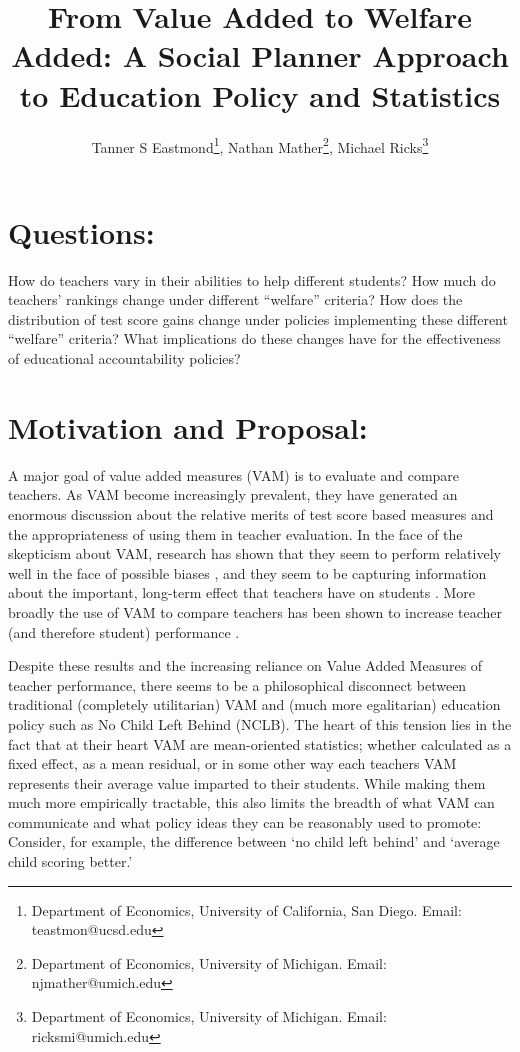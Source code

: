 \documentclass[letterpaper,12pt]{article}
\title{From Value Added to Welfare Added: A Social Planner Approach to Education Policy and Statistics}
\author{Tanner S Eastmond\thanks{Department of Economics, University of California, San Diego. Email: teastmon@ucsd.edu}, Nathan Mather\thanks{Department of Economics, University of Michigan. Email: njmather@umich.edu }, Michael Ricks\thanks{Department of Economics, University of Michigan. Email: ricksmi@umich.edu}}
\date{\vspace{-8ex}}
\begin{document}
\maketitle



\section{Questions:} 
How do teachers vary in their abilities to help different students? How much do teachers' rankings change under different ``welfare'' criteria? How does the distribution of test score gains change under policies implementing these different ``welfare'' criteria? What implications do these changes have for the effectiveness of educational accountability policies? 



\section{Motivation and Proposal:}
A major goal of value added measures (VAM) is to evaluate and compare teachers. As VAM become increasingly prevalent, they have generated an enormous discussion about the relative merits of test score based measures and the appropriateness of using them in teacher evaluation. In the face of the skepticism about VAM, research has shown that they seem to perform relatively well in the face of possible biases \citep{chetty2014measuring1}, and they seem to be capturing information about the important, long-term effect that teachers have on students \citep{chetty2014measuring2}. More broadly the use of VAM to compare teachers has been shown to increase teacher (and therefore student) performance \citep{pope2019effect}.

Despite these results and the increasing reliance on Value Added Measures of teacher performance, there seems to be a philosophical disconnect between traditional (completely utilitarian) VAM and (much more egalitarian) education policy such as No Child Left Behind (NCLB). The heart of this tension lies in the fact that at their heart VAM are mean-oriented statistics; whether calculated as a fixed effect, as a mean residual, or in some other way each teachers VAM represents their average value imparted to their students. While making them much more empirically tractable, this also limits the breadth of what VAM can communicate and what policy ideas they can be reasonably used to promote: Consider, for example, the difference between `no child left behind' and `average child scoring better.'
\end{document}
